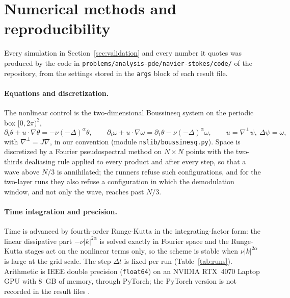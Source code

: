 \documentclass[11pt]{article}
\theoremstyle{remark}
\newcommand{\ev}[1]{\hspace{0.2em}{\small\textsf{[#1]}}}
\newcommand{\fp}[1]{\nolinkurl{#1}}
\begin{document}
\section{Numerical methods and reproducibility}\label{sec:method}

Every simulation in Section~\ref{sec:validation} and every number it quotes was produced by the code in
\fp{problems/analysis-pde/navier-stokes/code/} of the repository, from the settings stored in the
\fp{args} block of each result file.

\paragraph{Equations and discretization.} The nonlinear control is the two-dimensional Boussinesq system
on the periodic box $[0,2\pi)^{2}$,
\[
\partial_{t}\theta+u\cdot\nabla\theta=-\nu(-\Delta)^{\alpha}\theta,\qquad
\partial_{t}\omega+u\cdot\nabla\omega=\partial_{1}\theta-\nu(-\Delta)^{\alpha}\omega,\qquad
u=\nabla^{\perp}\psi,\ \Delta\psi=\omega ,
\]
with $\nabla^{\perp}=J\nabla$, in our convention (module \fp{nslib/boussinesq.py}). Space is
discretized by a Fourier pseudospectral method on $N\times N$ points with the two-thirds dealiasing
rule applied to every product and after every step, so that a wave above $N/3$ is annihilated;
the runners refuse such configurations, and for the two-layer runs they also refuse a configuration in
which the demodulation window, and not only the wave, reaches past $N/3$.

\paragraph{Time integration and precision.} Time is advanced by fourth-order Runge-Kutta in the
integrating-factor form: the linear dissipative part $-\nu|k|^{2\alpha}$ is solved exactly in Fourier
space and the Runge-Kutta stages act on the nonlinear terms only, so the scheme is stable when
$\nu|k|^{2\alpha}$ is large at the grid scale. The step $\Delta t$ is fixed per run
(Table~\ref{tab:runs}). Arithmetic is IEEE double precision (\fp{float64}) on an
NVIDIA RTX~4070 Laptop GPU with 8~GB of memory, through PyTorch; the PyTorch version is not recorded in
the result files \ev{U}.
\end{document}
